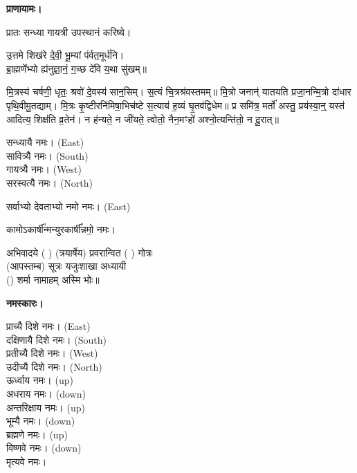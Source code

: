 \textbf{प्राणायामः।}


प्रातः सन्ध्या गायत्री उपस्थानं करिष्ये।

उ॒त्तमे शिख॑रे दे॒वी॒ भू॒म्यां प॑र्वत॒मूर्ध॑नि।\\
ब्रा॒ह्मणे॑॑भ्यो ह्य॑नुज्ञा॒नं॒ ग॒च्छ दे॑वि य॒था सु॑खम्॥


मि॒त्रस्य॑ चर्\mbox{}षणी॒ धृतः॒ श्रवो॑ दे॒वस्य॑ सान॒सिम्। स॒त्यं चि॒त्रश्र॑वस्तमम्॥ मि॒त्रो जनान्॑ यातयति प्रजा॒नन्मि॒त्रो दा॑धार पृथि॒वीमु॒तद्याम्। मि॒त्रः कृ॒ष्टीरनि॑मिषा॒भिच॑ष्टे स॒त्याय॑ ह॒व्यं घृ॒तव॑द्विधेम॥ प्र समि॑त्र॒ मर्तो॑ अस्तु॒ प्रय॑स्वा॒न्॒ यस्त॑ आदित्य॒ शिक्ष॑ति व्र॒तेन॑। न ह॑न्यते॒ न जी॑यते॒ त्वोतो॒ नैन॒मꣳहो॑ अश्नो॒त्यन्ति॑तो॒ न दू॒रात्॥



सन्ध्यायै नमः।  {\scriptsize (East)}\\
सावित्र्यै नमः। {\scriptsize (South)}\\
गायत्र्यै नमः।  {\scriptsize (West)}\\
सरस्वत्यै नमः।  {\scriptsize (North)}

सर्वाभ्यो देवताभ्यो नमो नमः। {\scriptsize (East)}

कामोऽकार्\mbox{}षी᳚न्मन्युरकार्\mbox{}षी᳚न्नमो॒ नमः।

अभिवादये ( ) (त्रयार्षेय) प्रवरान्वित ( ) गोत्रः\\
(आपस्तम्ब) सूत्रः यजुःशाखा अध्यायी\\
() शर्मा नामाहम् अस्मि भोः॥

\textbf{नमस्कारः।}


प्राच्यै दिशे नमः।   {\scriptsize (East)}\\
दक्षिणायै दिशे नमः।  {\scriptsize (South)}\\
प्रतीच्यै दिशे नमः।   {\scriptsize (West)}\\
उदीच्यै दिशे नमः।   {\scriptsize (North)}\\
ऊर्ध्वाय नमः।   {\scriptsize (up)}\\
अधराय नमः।   {\scriptsize (down)}\\
अन्तरिक्षाय नमः। {\scriptsize (up)}\\
भूम्यै नमः। {\scriptsize (down)}\\
ब्रह्मणे नमः। {\scriptsize (up)}\\
विष्णवे नमः।  {\scriptsize (down)}\\
मृत्यवे नमः।

